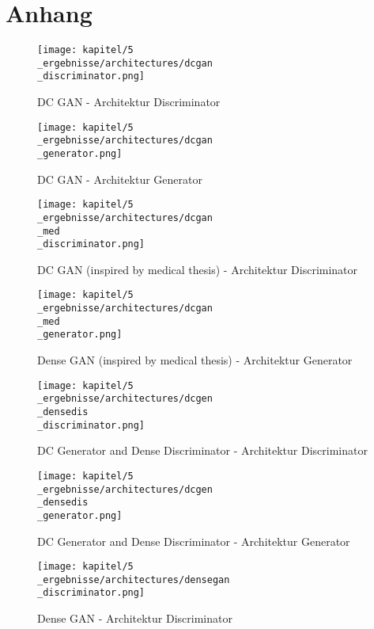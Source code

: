 \chapter{Anhang}

\begin{figure}[H]
	\centering
	\texttt{[image: kapitel/5\\\_ergebnisse/architectures/dcgan\\\_discriminator.png]}
	\caption{DC GAN - Architektur Discriminator}
	\label{architecture:dcgan-dis}
\end{figure}

\begin{figure}[H]
	\centering
	\texttt{[image: kapitel/5\\\_ergebnisse/architectures/dcgan\\\_generator.png]}
	\caption{DC GAN - Architektur Generator}
	\label{architecture:dcgan-gen}
\end{figure}

\begin{figure}[H]
	\centering
	\texttt{[image: kapitel/5\\\_ergebnisse/architectures/dcgan\\\_med\\\_discriminator.png]}
	\caption{DC GAN (inspired by medical thesis) - Architektur Discriminator}
	\label{architecture:dcgan-med-dis}
\end{figure}

\begin{figure}[H]
	\centering
	\texttt{[image: kapitel/5\\\_ergebnisse/architectures/dcgan\\\_med\\\_generator.png]}
	\caption{Dense GAN (inspired by medical thesis) - Architektur Generator}
	\label{architecture:dcgan-med-gen}
\end{figure}

\begin{figure}[H]
	\centering
	\texttt{[image: kapitel/5\\\_ergebnisse/architectures/dcgen\\\_densedis\\\_discriminator.png]}
	\caption{DC Generator and Dense Discriminator - Architektur Discriminator}
	\label{architecture:dcgen-densedis-dis}
\end{figure}

\begin{figure}[H]
	\centering
	\texttt{[image: kapitel/5\\\_ergebnisse/architectures/dcgen\\\_densedis\\\_generator.png]}
	\caption{DC Generator and Dense Discriminator - Architektur Generator}
	\label{architecture:dcgen-densedis-gen}
\end{figure}

\begin{figure}[H]
	\centering
	\texttt{[image: kapitel/5\\\_ergebnisse/architectures/densegan\\\_discriminator.png]}
	\caption{Dense GAN - Architektur Discriminator}
	\label{architecture:densegan-dis}
\end{figure}

